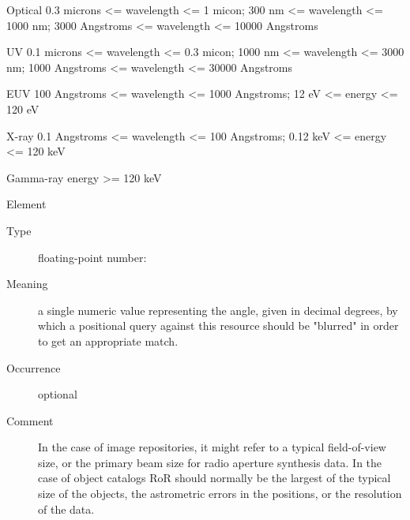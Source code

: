 \documentclass[11pt,a4paper]{ivoa}
\begin{document}
\begin{generated}
\begin{bigdescription}
\begin{description}
\begin{longtermsdescription}
\item[Optical]
                 0.3 microns <= wavelength <= 1 micon; 
                 300 nm <= wavelength <= 1000 nm; 
                 3000 Angstroms <= wavelength <= 10000 Angstroms
               
\item[UV]
                 0.1 microns <= wavelength <= 0.3 micon; 
                 1000 nm <= wavelength <= 3000 nm; 
                 1000 Angstroms <= wavelength <= 30000 Angstroms
               
\item[EUV]
                 100 Angstroms <= wavelength <= 1000 Angstroms; 
                 12 eV <= energy <= 120 eV
               
\item[X-ray]
                 0.1 Angstroms <= wavelength <= 100 Angstroms; 
                 0.12 keV <= energy <= 120 keV
               
\item[Gamma-ray]
                 energy >= 120 keV
               
\end{longtermsdescription}

\end{description}
\item[Element \xmlel{regionOfRegard}]
\begin{description}
\item[Type] floating-point number: 
\item[Meaning] 
                  a single numeric value representing the angle, given
                  in decimal degrees, by which a positional query
                  against this resource should be {"}blurred{"} in order
                  to get an appropriate match. 
               
\item[Occurrence] optional
\item[Comment] 
                  In the case of image repositories, it might refer to
                  a typical field-of-view size, or the primary beam
                  size for radio aperture synthesis data.  In the case
                  of object catalogs RoR should normally be the
                  largest of the typical size of the objects, the
                  astrometric errors in the positions, or the
                  resolution of the data.  
               

\end{description}


\end{bigdescription}\endgroup

\endgroup
\end{generated}
\end{document}
